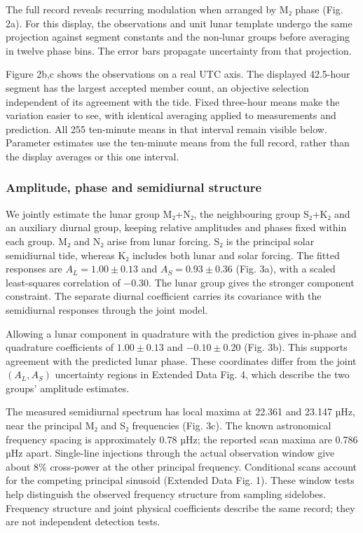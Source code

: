 \documentclass[
  12pt,
  a4paper,
]{article}
\begin{document}
The full record reveals recurring modulation when arranged by M₂ phase
(Fig. 2a). For this display, the observations and unit lunar template
undergo the same projection against segment constants and the non-lunar
groups before averaging in twelve phase bins. The error bars propagate
uncertainty from that projection.

Figure 2b,c shows the observations on a real UTC axis. The displayed
42.5-hour segment has the largest accepted member count, an objective
selection independent of its agreement with the tide. Fixed three-hour
means make the variation easier to see, with identical averaging applied
to measurements and prediction. All 255 ten-minute means in that
interval remain visible below. Parameter estimates use the ten-minute
means from the full record, rather than the display averages or this one
interval.

\hypertarget{amplitude-phase-and-semidiurnal-structure}{%
\subsubsection{Amplitude, phase and semidiurnal
structure}\label{amplitude-phase-and-semidiurnal-structure}}

We jointly estimate the lunar group M₂+N₂, the neighbouring group S₂+K₂
and an auxiliary diurnal group, keeping relative amplitudes and phases
fixed within each group. M₂ and N₂ arise from lunar forcing. S₂ is the
principal solar semidiurnal tide, whereas K₂ includes both lunar and
solar forcing. The fitted responses are \(A_L=1.00\pm0.13\) and
\(A_S=0.93\pm0.36\) (Fig. 3a), with a scaled least-squares correlation
of −0.30. The lunar group gives the stronger component constraint. The
separate diurnal coefficient carries its covariance with the semidiurnal
responses through the joint model.

Allowing a lunar component in quadrature with the prediction gives
in-phase and quadrature coefficients of \(1.00\pm0.13\) and
\(-0.10\pm0.20\) (Fig. 3b). This supports agreement with the predicted
lunar phase. These coordinates differ from the joint \((A_L,A_S)\)
uncertainty regions in Extended Data Fig. 4, which describe the two
groups' amplitude estimates.

The measured semidiurnal spectrum has local maxima at 22.361 and 23.147
µHz, near the principal M₂ and S₂ frequencies (Fig. 3c). The known
astronomical frequency spacing is approximately 0.78 µHz; the reported
scan maxima are 0.786 µHz apart. Single-line injections through the
actual observation window give about 8\% cross-power at the other
principal frequency. Conditional scans account for the competing
principal sinusoid (Extended Data Fig. 1). These window tests help
distinguish the observed frequency structure from sampling sidelobes.
Frequency structure and joint physical coefficients describe the same
record; they are not independent detection tests.
\end{document}
